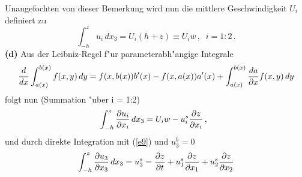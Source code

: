 \documentclass[12pt,a4paper,leqno,twoside]{book}
\begin{document}
\par
Unangefochten von dieser Bemerkung wird nun die mittlere Geschwindigkeit $U_i$ 
definiert zu
%
\begin{equation}\label{e12}
\int_{-h}^z u_i\,dx_3 = U_i(h + z) \equiv U_i w\,,\;\; i = 1:2\,.
\end{equation}
{\bf (d)}
Aus der {\sc Leibniz}-Regel f"ur parameterabh"angige Integrale
%
\begin{equation}\label{e13}
\frac{d}{dx}\int_{a(x)}^{b(x)}f(x,y)\,dy
= f(x,b(x))b'(x) - f(x,a(x))a'(x)
+ \int_{a(x)}^{b(x)}\frac{da}{\partial x}f(x,y)\, dy
\end{equation}
%
folgt nun
(Summation "uber i = 1:2)
%
\begin{equation}\label{e14}
\int_{-h}^z\frac{\partial u_i}{\partial x_i}\,dx_3
= U_iw - u^s_i\frac{\partial z}{\partial x_i}\,,\;\; 
\end{equation}
und durch direkte Integration mit (\ref{e9}) und $u^b_3 = 0$
%
 \begin{equation}\label{e15}
\int_{-h}^z\frac{\partial u_3}{\partial x_3}\,dx_3 
= u^s_3 = \frac{\partial z}{\partial t} + u^s_1\frac{\partial z}{\partial x_1}
 + u^s_2\frac{\partial z}{\partial x_2}
\end{equation}
\end{document}
